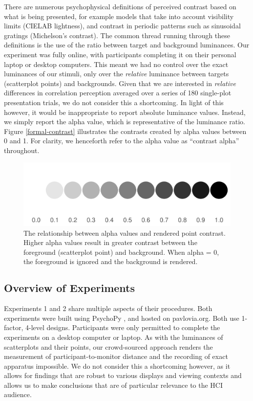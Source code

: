 \documentclass[preprint, 3p,
authoryear]{elsarticle} %
\begin{document}
There are numerous psychophysical definitions of perceived contrast
\citep{zuffi_2007} based on what is being presented, for example models
that take into account visibility limits (CIELAB lightness), and
contrast in periodic patterns such as sinusoidal gratings (Michelson's
contrast). The common thread running through these definitions is the
use of the ratio between target and background luminances. Our
experiment was fully online, with participants completing it on their
personal laptop or desktop computers. This meant we had no control over
the exact luminances of our stimuli, only over the \emph{relative}
luminance between targets (scatterplot points) and backgrounds. Given
that we are interested in \emph{relative} differences in correlation
perception averaged over a series of 180 single-plot presentation
trials, we do not consider this a shortcoming. In light of this however,
it would be inappropriate to report absolute luminance values. Instead,
we simply report the alpha value, which is representative of the
luminance ratio. Figure \ref{formal-contrast} illustrates the contrasts
created by alpha values between 0 and 1. For clarity, we henceforth
refer to the alpha value as ``contrast alpha'' throughout.

\begin{figure}

\includegraphics[width=0.5\linewidth]{contrast_and_scatterplots_files/figure-latex/formal-contrast-1} \hfill{}

\caption{\label{formal-contrast}The relationship between alpha values and rendered point contrast. Higher alpha values result in greater contrast between the foreground (scatterplot point) and background. When alpha = 0, the foreground is ignored and the background is rendered.}\label{fig:formal-contrast}
\end{figure}

\hypertarget{overview-of-experiments}{%
\subsection{Overview of Experiments}\label{overview-of-experiments}}

Experiments 1 and 2 share multiple aspects of their procedures. Both
experiments were built using PsychoPy \citep{pierce_psychopy_2019}, and
hosted on pavlovia.org. Both use 1-factor, 4-level designs. Participants
were only permitted to complete the experiments on a desktop computer or
laptop. As with the luminances of scatterplots and their points, our
crowd-sourced approach renders the measurement of participant-to-monitor
distance and the recording of exact apparatus impossible. We do not
consider this a shortcoming however, as it allows for findings that are
robust to various displays and viewing contexts and allows us to make
conclusions that are of particular relevance to the HCI audience.
\end{document}
